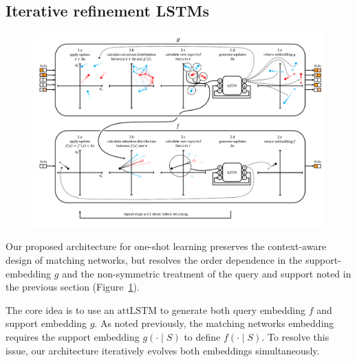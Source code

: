 \documentclass[journal=jacsat,manuscript=article]{achemso}
\begin{document}


\subsection{Iterative refinement LSTMs}
\begin{figure}[h]
\includegraphics[width=\textwidth]{resiembedding_graphic_v2.png}
\label{fig:resiembed}
\end{figure}

Our proposed architecture for one-shot learning preserves the context-aware design of matching networks, but resolves the order dependence in the support-embedding $g$ and the non-symmetric treatment of the query and support noted in the previous section (Figure~\ref{fig:resiembed}).

The core idea is to use an $\text{attLSTM}$ to generate both query embedding $f$ and support embedding $g$. As noted previously, the matching networks \cite{vinyals2016matching} embedding requires the support embedding $g(\cdot \mid S)$ to define $f(\cdot \mid S)$. To resolve this issue, our architecture iteratively evolves both embeddings simultaneously.
\end{document}
